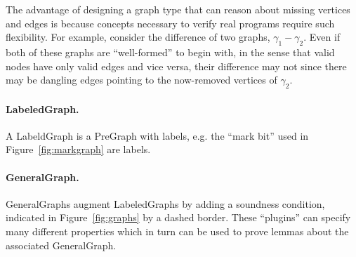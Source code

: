 The advantage of designing a graph type that can reason about missing vertices and edges is because concepts necessary to verify real programs require such flexibility.  For example, consider the difference of two graphs, $\gamma_1 - \gamma_2$.  Even if both of these graphs are ``well-formed'' to begin with, in the sense that valid nodes have only valid edges and vice versa, their difference may not since there may be dangling edges pointing to the now-removed vertices of $\gamma_2$.
\fi


\iftrue
\paragraph{LabeledGraph.}
A LabeldGraph is a PreGraph with labels, e.g. the ``mark bit'' used in Figure~\ref{fig:markgraph} are labels.
\fi
\iffalse
\paragraph{LabeledGraph.}
Although many basic lemmas can be proved about PreGraphs, they are inadequate for real program verification.
When reasoning about the concrete graphs manipulated by various algorithms,
we usually need to add a notion of \emph{labels} on vertices and/or edges, such as
the ``mark bit'' used in Figure~\ref{fig:markgraph}, letting us define notions like ``the vertices reachable via an unmarked path''
on LabeledGraphs.
\fi

\paragraph{GeneralGraph.}
GeneralGraphs augment LabeledGraphs by adding a soundness condition, indicated in Figure~\ref{fig:graphs} by a dashed border.  These ``plugins'' can specify many different properties which in turn can be used to prove lemmas about the associated GeneralGraph.

